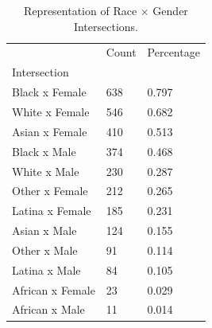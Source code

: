 \begin{table}[htbp]
\centering
\caption{Representation of Race × Gender Intersections.}
\label{tab:eda_intersections}
\begin{tabular}{lll}
\toprule
 & Count & Percentage \\
Intersection &  &  \\
\midrule
Black x Female & 638 & 0.797 \\
White x Female & 546 & 0.682 \\
Asian x Female & 410 & 0.513 \\
Black x Male & 374 & 0.468 \\
White x Male & 230 & 0.287 \\
Other x Female & 212 & 0.265 \\
Latina x Female & 185 & 0.231 \\
Asian x Male & 124 & 0.155 \\
Other x Male & 91 & 0.114 \\
Latina x Male & 84 & 0.105 \\
African x Female & 23 & 0.029 \\
African x Male & 11 & 0.014 \\
\bottomrule
\end{tabular}

\end{table}